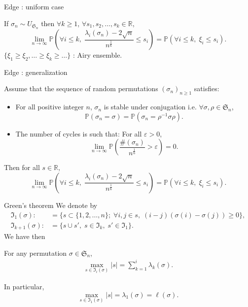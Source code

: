 \documentclass[english]{beamer}
\begin{document}
\begin{frame}{Edge : uniform case}
\begin{theorem} 
 If $\sigma_n \sim {U}_{\mathfrak{S}_n}$ then  $\forall k \geq 1 $,  $\forall s_1,s_2,\dots,s_k \in \mathbb{R}$,
\begin{equation*} 
\lim_{n\to \infty}\mathbb{P}\left(\forall i\leq k, \;\frac{\lambda_i(\sigma_n)-2\sqrt{n}}{n^\frac{1}{6}}\leq s_i\right)=\mathbb{P}(\forall i\leq k,\;\xi_i\leq s_i).
\end{equation*}
$\{\xi_1\geq \xi_2,\dots\geq  \xi_k \geq  \dots \}$ : Airy ensemble.
\end{theorem}

\end{frame}
\begin{frame}{Edge : generalization}
    \begin{theorem}[\cite{sk}]
Assume that the sequence of random permutations  $(\sigma_n)_{n\geq 1}$ satisfies:
\begin{itemize}
\item  For all positive integer $n$, $\sigma_n$ is stable under conjugation i.e.  $\forall \sigma , \rho \in \mathfrak{S}_n$,
\begin{equation}\tag{H1}
\mathbb{P}(\sigma_n=\sigma)=\mathbb{P}(\sigma_n=\rho^{-1}\sigma\rho).
\end{equation}
\item The number of cycles is such that: For all $\varepsilon>0$,
\begin{equation}\tag{H2}
\lim_{n\to \infty}\mathbb{P}\left(\frac{\#(\sigma_n)}{n^\frac 16 }>\varepsilon\right) =0.
\end{equation}
\end{itemize}
Then  for all  $s \in \mathbb{R}$,
\begin{equation*} 
\lim_{n\to \infty}\mathbb{P}\left(\forall i\leq k, \;\frac{\lambda_i(\sigma_n)-2\sqrt{n}}{n^\frac{1}{6}}\leq s_i\right)=\mathbb{P}(\forall i\leq k,\;\xi_i\leq s_i).\end{equation*}
\end{theorem}
\end{frame}

\begin{frame}{Green's theorem}
    We denote by  \begin{align*}
\mathfrak{I}_1(\sigma):&=\{s\subset\{1,2,\dots,n\};\; \forall i,j \in s,\; (i-j)(\sigma(i)-\sigma(j))\geq 0 \},
\\\mathfrak{I}_{k+1}(\sigma):&=\{s\cup s',\; s\in \mathfrak{I}_k,\;s'\in \mathfrak{I}_1\}.
\end{align*}
We have then
\begin{lemma}
For any permutation $ \sigma\in \mathfrak{S}_n$,
\begin{align*}
\max_{s\in \mathfrak{I}_i(\sigma)} |s| =\sum_{k=1}^i \lambda_k(\sigma).
\end{align*}
\end{lemma}
In particular, $$\max_{s\in \mathfrak{I}_1(\sigma)} |s| =\lambda_1(\sigma)=\ell(\sigma).$$
\end{frame}
\end{document}
